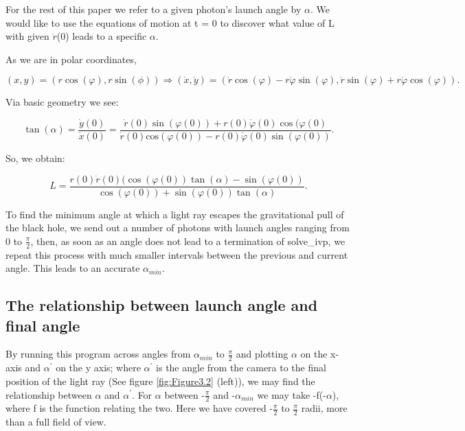\documentclass[oneside,openright,frontopenright, singlespacing]{dmathesis}
\begin{document}
	For the rest of this paper we refer to a given photon's launch angle by $\alpha$. We would like to use the equations of motion at t = 0 to discover what value of L with given $\dot{r}$(0) leads to a specific $\alpha$.

\vspace{1em}
	As we are in polar coordinates, 

	\[(x, y) = (r\cos(\varphi), r\sin(\phi)) \Rightarrow (\dot{x}, \dot{y}) = (\dot{r}\cos(\varphi) - r\dot{\varphi}\sin(\varphi), \dot{r}\sin(\varphi) + r\dot{\varphi}\cos(\varphi)).\]
	
\vspace{1em}
	Via basic geometry we see:
			
	\[\tan(\alpha) = \frac{\dot{y}(0)}{\dot{x}(0)} = \frac{\dot{r}(0)\sin(\varphi(0)) + r(0)\dot{\varphi}(0)\cos(\varphi(0)}{\dot{r}(0)\mbox{cos}(\varphi(0)) - r(0)\dot{\varphi}(0)\sin(\varphi(0))}.\]

\vspace{1em}
	So, we obtain:

	\[ L = \frac{r(0)\dot{r}(0)(\cos(\varphi(0))\tan(\alpha)-\sin(\varphi(0))}{\cos(\varphi(0))+\sin(\varphi(0))\tan(\alpha)}.\]
	
\vspace{1em}
	To find the minimum angle at which a light ray escapes the gravitational pull of the black hole, we send out a number of photons with launch angles ranging from 0 to $\frac{\pi}{2}$, then, as soon as an angle does not lead to a termination of solve\_ivp, we repeat this process with much smaller intervals between the previous and current angle. This leads to an accurate $\alpha_{min}$.

\subsection{The relationship between launch angle and final angle}\label{subsec:Subsection3.5.3}

	By running this program across angles from $\alpha_{min}$ to $\frac{\pi}{2}$ and plotting $\alpha$ on the x-axis and $\alpha^{'}$ on the y axis; where  $\alpha^{'}$ is the angle from the camera to the final position of the light ray (See figure \ref{fig:Figure3.2} (left)), we may find the relationship between $\alpha$ and $\alpha^{'}$. For $\alpha$ between -$\frac{\pi}{2}$ and -$\alpha_{min}$ we may take -f(-$\alpha$), where f is the function relating the two. Here we have covered -$\frac{\pi}{2}$ to $\frac{\pi}{2}$ radii, more than a full field of view.
\end{document}
